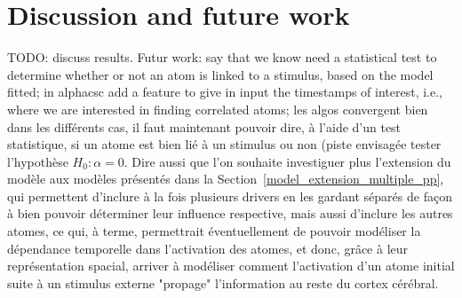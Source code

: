 \section{Discussion and future work}

TODO: discuss results.
Futur work: say that we know need a statistical test to determine whether or not an atom is linked to a stimulus, based on the model fitted; in alphacsc add a feature to give in input the timestamps of interest, i.e., where we are interested in finding correlated atoms; les algos convergent bien dans les différents cas, il faut maintenant pouvoir dire, à l'aide d'un test statistique, si un atome est bien lié à un stimulus ou non (piste envisagée tester l'hypothèse $H_0: \alpha=0$.
Dire aussi que l'on souhaite investiguer plus l'extension du modèle aux modèles présentés dans la Section~\ref{model_extension_multiple_pp}, qui permettent d'inclure à la fois plusieurs drivers en les gardant séparés de façon à bien pouvoir déterminer leur influence respective, mais aussi d'inclure les autres atomes, ce qui, à terme, permettrait éventuellement de pouvoir modéliser la dépendance temporelle dans l'activation des atomes, et donc, grâce à leur représentation spacial, arriver à modéliser comment l'activation d'un atome initial suite à un stimulus externe "propage" l'information au reste du cortex cérébral.


